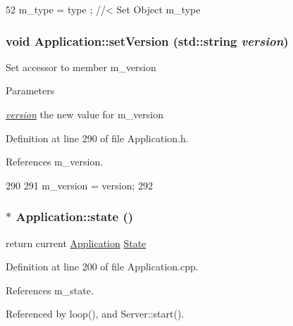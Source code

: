 \begin{DoxyCode}
52 { m_type  = type  ; } //< Set Object m_type
\end{DoxyCode}
\hypertarget{classApplication_a48ecc3d76b3f2390ae1ba76d13f8bd54}{
\subsubsection[{setVersion}]{\setlength{\rightskip}{0pt plus 5cm}void Application::setVersion (std::string {\em version})}}
\label{classApplication_a48ecc3d76b3f2390ae1ba76d13f8bd54}
Set accessor to member m\_\-version 
\begin{DoxyParams}{Parameters}
\item[{\em \hyperlink{namespaceversion}{version}}]the new value for m\_\-version \end{DoxyParams}


Definition at line 290 of file Application.h.

References m\_\-version.


\begin{DoxyCode}
290                                       {
291     m_version = version;
292   }
\end{DoxyCode}
\hypertarget{classApplication_adfc9b92559f61c92224abf03f51cef47}{
\subsubsection[{state}]{ $\ast$ Application::state ()}}
\label{classApplication_adfc9b92559f61c92224abf03f51cef47}
return current \hyperlink{classApplication}{Application} \hyperlink{classState}{State} 

Definition at line 200 of file Application.cpp.

References m\_\-state.

Referenced by loop(), and Server::start().


